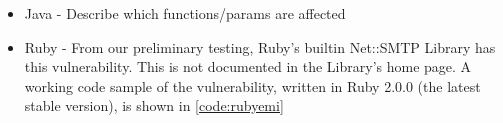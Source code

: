 \begin{itemize}
	
	\item Java - Describe which functions/params are affected
	\item Ruby - From our preliminary testing, Ruby's builtin Net::SMTP Library has this vulnerability. This is not documented in the Library's home page.
	A working code sample of the vulnerability, written in Ruby 2.0.0 (the latest stable version), is shown in \ref{code:rubyemi}
	
	
	


\end{itemize}
 
